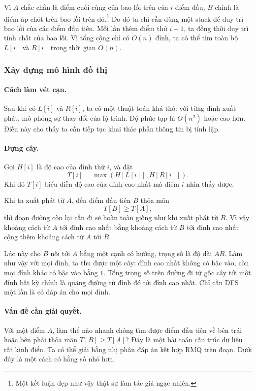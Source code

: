 \documentclass[11pt]{article}
\begin{document}
Vì \(A\) chắc chắn là điểm cuối cùng của bao lồi trên của \(i\) điểm đầu,
\(B\) chính là điểm áp chót trên bao lồi trên đó.\footnote{Một kết luận đẹp
như vậy thật sự làm tác giả ngạc nhiên.} Do đó ta chỉ cần dùng một stack để
duy trì bao lồi của các điểm đầu tiên. Mỗi lần thêm điểm thứ \(i+1\), ta đồng
thời duy trì tính chất của bao lồi. Vì tổng cộng chỉ có \(O(n)\) đỉnh, ta có
thể tìm toàn bộ \(L[i]\) và \(R[i]\) trong thời gian \(O(n)\).

\subsubsection{Xây dựng mô hình đồ thị}

\paragraph{Cách làm vét cạn.}
Sau khi có \(L[i]\) và \(R[i]\), ta có một thuật toán khá thô: với từng đỉnh
xuất phát, mô phỏng sự thay đổi của lộ trình. Độ phức tạp là \(O(n^2)\) hoặc
cao hơn. Điều này cho thấy ta cần tiếp tục khai thác phần thông tin bị tính
lặp.

\paragraph{Dựng cây.}
Gọi \(H[i]\) là độ cao của đỉnh thứ \(i\), và đặt
\[
  T[i]=\max(H[L[i]],H[R[i]]).
\]
Khi đó \(T[i]\) biểu diễn độ cao của đỉnh cao nhất mà điểm \(i\) nhìn thấy
được.

Khi ta xuất phát từ \(A\), đến điểm đầu tiên \(B\) thỏa mãn
\[
  T[B]\ge T[A],
\]
thì đoạn đường còn lại cần đi sẽ hoàn toàn giống như khi xuất phát từ \(B\).
Vì vậy khoảng cách từ \(A\) tới đỉnh cao nhất bằng khoảng cách từ \(B\) tới
đỉnh cao nhất cộng thêm khoảng cách từ \(A\) tới \(B\).

Lúc này cho \(B\) nối tới \(A\) bằng một cạnh có hướng, trọng số là độ dài
\(AB\). Làm như vậy với mọi đỉnh, ta thu được một cây: đỉnh cao nhất không có
bậc vào, còn mọi đỉnh khác có bậc vào bằng \(1\). Tổng trọng số trên đường đi
từ gốc cây tới một đỉnh bất kỳ chính là quãng đường từ đỉnh đó tới đỉnh cao
nhất. Chỉ cần DFS một lần là có đáp án cho mọi đỉnh.

\paragraph{Vấn đề cần giải quyết.}
Với một điểm \(A\), làm thế nào nhanh chóng tìm được điểm đầu tiên về bên
trái hoặc bên phải thỏa mãn \(T[B]\ge T[A]\)? Đây là một bài toán cấu trúc dữ
liệu rất kinh điển. Ta có thể giải bằng nhị phân đáp án kết hợp RMQ trên
đoạn. Dưới đây là một cách có hằng số nhỏ hơn.
\end{document}

